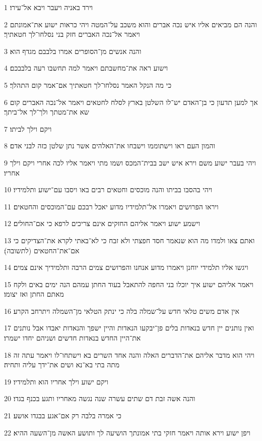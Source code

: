 \par 1 וירד באניה ויעבר ויבא אל־עירו׃
\par 2 והנה הם מביאים אליו איש נכה אברים והוא משכב על־המטה ויהי כראות ישוע את־אמונתם ויאמר אל־נכה האברים חזק בני נסלחו־לך חטאתיך׃
\par 3 והנה אנשים מן־הסופרים אמרו בלבבם מגדף הוא׃
\par 4 וישוע ראה את־מחשבתם ויאמר למה תחשבו רעה בלבבכם׃
\par 5 כי מה הנקל האמר נסלחו־לך חטאתיך אם־אמר קום התהלך׃
\par 6 אך למען תדעון כי בן־האדם יש־לו השלטן בארץ לסלח לחטאים ויאמר אל־נכה האברים קום שא את־מטתך ולך־לך אל־ביתך׃
\par 7 ויקם וילך לביתו׃
\par 8 והמון העם ראו וישתוממו וישבחו את־האלהים אשר נתן שלטן כזה לבני אדם׃
\par 9 ויהי בעבר ישוע משם וירא איש ישב בבית־המכס ושמו מתי ויאמר אליו לכה אחרי ויקם וילך אחריו׃
\par 10 ויהי בהסבו בביתו והנה מוכסים וחטאים רבים באו ויסבו עם־ישוע ותלמידיו׃
\par 11 ויראו הפרושים ויאמרו אל־תלמידיו מדוע יאכל רבכם עם־המוכסים והחטאים׃
\par 12 וישמע ישוע ויאמר אליהם החזקים אינם צריכים לרפא כי אם־החולים׃
\par 13 ואתם צאו ולמדו מה הוא שנאמר חסד חפצתי ולא זבח כי לא־באתי לקרא את־הצדיקים כי אם־את־החטאים (לתשובה)׃
\par 14 ויגשו אליו תלמידי יוחנן ויאמרו מדוע אנחנו והפרושים צמים הרבה ותלמידיך אינם צמים׃
\par 15 ויאמר אליהם ישוע איך יוכלו בני החפה להתאבל בעוד החתן עמהם הנה ימים באים ולקח מאתם החתן ואז יצומו׃
\par 16 אין אדם משים טלאי חדש על־שמלה בלה כי ינתק הטלאי מן־השמלה ויתרחב הקרע׃
\par 17 ואין נותנים יין חדש בנאדות בלים פן־יבקעו הנאדות והיין ישפך והנאדות יאבדו אבל נותנים את־היין החדש בנאדות חדשים ושניהם יחדו ישמרו׃
\par 18 ויהי הוא מדבר אליהם את־הדברים האלה והנה אחד השרים בא וישתחו־לו ויאמר עתה זה מתה בתי בא־נא ושים את־ידך עליה ותחיה׃
\par 19 ויקם ישוע וילך אחריו הוא ותלמידיו׃
\par 20 והנה אשה זבת דם שתים עשרה שנה נגשה מאחריו ותגע בכנף בגדו׃
\par 21 כי אמרה בלבה רק אם־אגע בבגדו אושע׃
\par 22 ויפן ישוע וירא אותה ויאמר חזקי בתי אמונתך הושיעה לך ותושע האשה מן־השעה ההיא׃
